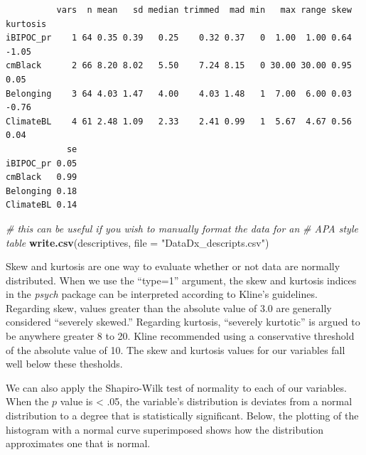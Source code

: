 \documentclass[
  11pt,
]{book}
\newenvironment{Shaded}{\begin{snugshade}}{\end{snugshade}}
\newcommand{\AttributeTok}[1]{\textcolor[rgb]{0.27,0.27,0.27}{#1}}
\newcommand{\CommentTok}[1]{\textcolor[rgb]{0.37,0.37,0.37}{\textit{#1}}}
\newcommand{\FunctionTok}[1]{\textcolor[rgb]{0.27,0.27,0.27}{\textbf{#1}}}
\newcommand{\NormalTok}[1]{#1}
\newcommand{\SpecialCharTok}[1]{\textcolor[rgb]{0.43,0.43,0.43}{\textbf{#1}}}
\newcommand{\StringTok}[1]{\textcolor[rgb]{0.5,0.5,0.5}{#1}}
\begin{document}
\begin{verbatim}
          vars  n mean   sd median trimmed  mad min   max range skew kurtosis
iBIPOC_pr    1 64 0.35 0.39   0.25    0.32 0.37   0  1.00  1.00 0.64    -1.05
cmBlack      2 66 8.20 8.02   5.50    7.24 8.15   0 30.00 30.00 0.95     0.05
Belonging    3 64 4.03 1.47   4.00    4.03 1.48   1  7.00  6.00 0.03    -0.76
ClimateBL    4 61 2.48 1.09   2.33    2.41 0.99   1  5.67  4.67 0.56     0.04
            se
iBIPOC_pr 0.05
cmBlack   0.99
Belonging 0.18
ClimateBL 0.14
\end{verbatim}

\begin{Shaded}
\begin{Highlighting}[]
\CommentTok{\# this can be useful if you wish to manually format the data for an}
\CommentTok{\# APA style table}
\FunctionTok{write.csv}\NormalTok{(descriptives, }\AttributeTok{file =} \StringTok{"DataDx\_descripts.csv"}\NormalTok{)}
\end{Highlighting}
\end{Shaded}

Skew and kurtosis are one way to evaluate whether or not data are normally distributed. When we use the ``type=1'' argument, the skew and kurtosis indices in the \emph{psych} package can be interpreted according to Kline's \citeyearpar{kline_data_2016} guidelines. Regarding skew, values greater than the absolute value of 3.0 are generally considered ``severely skewed.'' Regarding kurtosis, ``severely kurtotic'' is argued to be anywhere greater 8 to 20. Kline recommended using a conservative threshold of the absolute value of 10. The skew and kurtosis values for our variables fall well below these thesholds.

We can also apply the Shapiro-Wilk test of normality to each of our variables. When the \(p\) value is \textless{} .05, the variable's distribution is deviates from a normal distribution to a degree that is statistically significant. Below, the plotting of the histogram with a normal curve superimposed shows how the distribution approximates one that is normal.

\begin{Shaded}
\end{Shaded}
\end{document}
